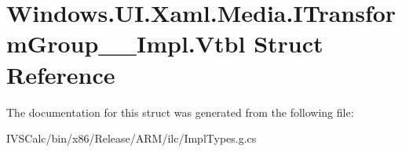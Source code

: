 \hypertarget{struct_windows_1_1_u_i_1_1_xaml_1_1_media_1_1_i_transform_group_____impl_1_1_vtbl}{}\section{Windows.\+U\+I.\+Xaml.\+Media.\+I\+Transform\+Group\+\_\+\+\_\+\+Impl.\+Vtbl Struct Reference}
\label{struct_windows_1_1_u_i_1_1_xaml_1_1_media_1_1_i_transform_group_____impl_1_1_vtbl}


The documentation for this struct was generated from the following file\+:\begin{DoxyCompactItemize}
\item 
I\+V\+S\+Calc/bin/x86/\+Release/\+A\+R\+M/ilc/Impl\+Types.\+g.\+cs\end{DoxyCompactItemize}
